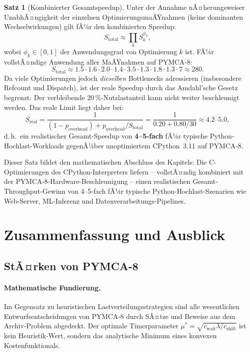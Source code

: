 ﻿\documentclass[a4paper,12pt]{scrreprt}
\theoremstyle{definition}
\newtheorem{satz}{Satz}[section]
\begin{document}
	\begin{satz}[Kombinierter Gesamtspeedup]
		\label{satz:total_speedup}
		Unter der Annahme nÃ¤herungsweiser UnabhÃ¤ngigkeit der einzelnen
		OptimierungsmaÃŸnahmen (keine dominanten Wechselwirkungen) gilt
		fÃ¼r den kombinierten Speedup:
		\[
		S_{\mathrm{total}} \approx \prod_{k} S_k^{\phi_k},
		\]
		wobei $\phi_k \in [0,1]$ der Anwendungsgrad von Optimierung $k$
		ist. FÃ¼r vollstÃ¤ndige Anwendung aller MaÃŸnahmen auf PYMCA-8:
		\[
		S_{\mathrm{total}} \approx 1.5 \cdot 1.6 \cdot 2.0 \cdot 1.4
		\cdot 3.5 \cdot 1.3 \cdot 1.8 \cdot 1.3 \cdot 7 \approx 280.
		\]
		Da viele Optimierungen jedoch \emph{dieselben} Bottlenecks adressieren
		(insbesondere Refcount und Dispatch), ist der reale Speedup durch
		das Amdahl'sche Gesetz begrenzt: Der verbleibende 20\,\%-Nutzlastanteil
		kann nicht weiter beschleunigt werden. Das reale Limit liegt daher bei:
		\[
		S_{\mathrm{real}} = \frac{1}{(1 - p_{\mathrm{overhead}}) +
			p_{\mathrm{overhead}} / S_{\mathrm{total}}}
		= \frac{1}{0.20 + 0.80/30} \approx 4.2\text{--}5.0,
		\]
		d.\,h.\ ein realistischer Gesamt-Speedup von \textbf{4--5-fach}
		fÃ¼r typische Python-Hochlast-Work\-loads gegenÃ¼ber unoptimiertem
		CPython~3.11 auf PYMCA-8.
	\end{satz}
	
	Dieser Satz bildet den mathematischen Abschluss des Kapitels:
	Die C-Optimierungen des CPython-Interpreters liefern -- vollstÃ¤ndig
	kombiniert mit der PYMCA-8-Hardware-Beschleunigung -- einen
	realistischen Gesamt-Throughput-Gewinn von 4--5-fach fÃ¼r typische
	Python-Hochlast-Szenarien wie Web-Server, ML-Inferenz und
	Datenverarbeitungs-Pipelines.
	

	\section{Zusammenfassung und Ausblick}
	
	\subsection{StÃ¤rken von PYMCA-8}
	
	\paragraph{Mathematische Fundierung.}
	Im Gegensatz zu heuristischen Lastverteilungsstrategien sind alle
	wesentlichen Entwurfsentscheidungen von PYMCA-8 durch
	SÃ¤tze und Beweise aus dem Archiv-Problem \cite{epp2026archiv} abgedeckt.
	Der optimale Timerparameter $\mu^* = \sqrt{c_{\mathrm{wait}} \lambda /
		c_{\mathrm{shift}}}$ ist kein Heuristik-Wert, sondern das analytische
	Minimum eines konvexen Kostenfunktionals.
	
\end{document}
